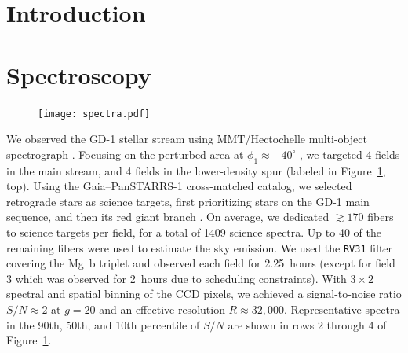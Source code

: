 \documentclass[twocolumn]{aastex63}
\newcommand{\kms}{\ensuremath{\textrm{km}\,\textrm{s}^{-1}}}
\begin{document}

\section{Introduction}
\label{sec:intro}



\section{Spectroscopy}
\label{sec:spec}

\begin{figure}
\begin{center}
\texttt{[image: spectra.pdf]}
\end{center}
\caption{
}
\label{fig:spectra}
\end{figure}

We observed the GD-1 stellar stream using MMT/Hectochelle multi-object spectrograph \citep{szentgyorgyi2011}.
Focusing on the perturbed area at $\phi_1\approx-40^\circ$ \citep[$\phi_{1,2}$ are coordinates oriented along and perpendicular to GD-1, respectively;][]{koposov2010}, we targeted 4 fields in the main stream, and 4 fields in the lower-density spur (labeled in Figure~\ref{fig:spectra}, top).
Using the Gaia--PanSTARRS-1 cross-matched catalog, we selected retrograde stars as science targets, first prioritizing stars on the GD-1 main sequence, and then its red giant branch \citep[see][]{pwb}.
On average, we dedicated $\gtrsim170$ fibers to science targets per field, for a total of 1409 science spectra.
Up to 40 of the remaining fibers were used to estimate the sky emission.
We used the \texttt{RV31} filter covering the Mg~b triplet and observed each field for 2.25~hours (except for field 3 which was observed for 2~hours due to scheduling constraints).
With $3\times2$ spectral and spatial binning of the CCD pixels, we achieved a signal-to-noise ratio $S/N\approx2$ at $g=20$ and an effective resolution $R\approx32,000$.
Representative spectra in the 90th, 50th, and 10th percentile of $S/N$ are shown in rows 2 through 4 of Figure~\ref{fig:spectra}.
\end{document}
